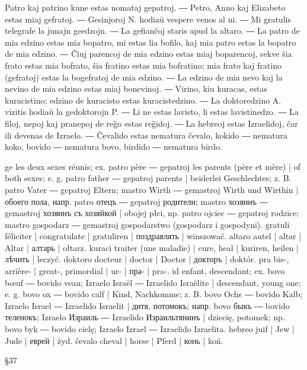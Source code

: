 Patro kaj patrino kune estas nomataj gepatroj. ― Petro, Anno kaj Elizabeto estas miaj gefratoj. ― Gesinjoroj N. hodiaŭ vespere venos al ni. ― Mi gratulis telegrafe la junajn geedzojn. ― La gefianĉoj staris apud la altaro. ― La patro de mia edzino estas mia bopatro, mi estas lia bofilo, kaj mia patro estas la bopatro de mia edzino. ― Ĉiuj parencoj de mia edzino estas miaj boparencoj, sekve ŝia frato estas mia bofrato, ŝia fratino estas mia bofratino; mia frato kaj fratino (gefratoj) estas la bogefratoj de mia edzino. ― La edzino de mia nevo kaj la nevino de mia edzino estas miaj bonevinoj. ― Virino, kiu kuracas, estas kuracistino; edzino de kuracisto estas kuracistedzino. ― La doktoredzino A. vizitis hodiaŭ la gedoktorojn P. ― Li ne estas lavisto, li estas lavistinedzo. ― La filoj, nepoj kaj pranepoj de reĝo estas reĝidoj. ― La hebreoj estas Izraelidoj, ĉar ili devenas de Izraelo. ― Ĉevalido estas nematura ĉevalo, kokido ― nematura koko, bovido ― nematura bovo, birdido ― nematura birdo.

ge les deux sexes réunis; ex. patro père ― gepatroj les parents (père et mère) | of both sexes; e. g. patro father ― gepatroj parents | beiderlei Geschlechtes; z. B. patro Vater ― gepatroj Eltern; mastro Wirth ― gemastroj Wirth und Wirthin | обоего пола, напр. patro отецъ ― gepatroj родители; mastro хозяинъ ― gemastroj хозяинъ съ хозяйкой | obojej płci, np. patro ojciec ― gepatroj rodzice; mastro gospodarz ― gemastroj gospodarstwo (gospodarz i gospodyni).
gratuli féliciter | congratulate | gratuliren | поздравлять | winszować.
altaro autel | altar | Altar | алтарь | ołtarz.
kuraci traiter (une maladie) | cure, heal | kuriren, heilen | лѣчить | leczyć.
doktoro docteur | doctor | Doctor | докторъ | doktór.
pra bis-, arrière- | great-, primordial | ur- | пра- | pra-.
id enfant, descendant; ex. bovo bœuf ― bovido veau; Izraelo Israël ― Izraelido Israëlite | descendant, young one; e. g. bovo ox ― bovido calf | Kind, Nachkomme; z. B. bovo Ochs ― bovido Kalb; Izraelo Israel ― Izraelido Israelit | дитя, потомокъ; напр. bovo быкъ ― bovido теленокъ; Izraelo Израиль ― Izraelido Израильтянинъ | dziecię, potomek; np. bovo byk ― bovido cielę; Izraelo Izrael ― Izraelido Izraelita.
hebreo juif | Jew | Jude | еврей | żyd.
ĉevalo cheval | horse | Pferd | конь | koń.

§37

